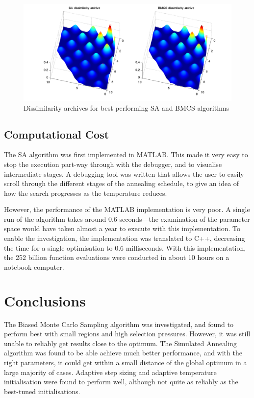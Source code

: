 \documentclass[10pt]{article}
\begin{document}
\begin{figure}[tbp]
  \begin{center}
    \includegraphics[width=15cm]{sa_bmcs_dissim.pdf}
    \end{center}
    \caption{Dissimilarity archives for best performing SA and BMCS algorithms}
    \label{fig:sa_bmcs_dissim}
    \end{figure}

\subsection{Computational Cost}

The SA algorithm was first implemented in MATLAB. This made it very easy to
stop the execution part-way through with the debugger, and to visualise
intermediate stages. A debugging tool was written that allows the user to
easily scroll through the different stages of the annealing schedule, to give
an idea of how the search progresses as the temperature reduces.

However, the performance of the MATLAB implementation is very poor. A single
run of the algorithm takes around 0.6 seconds---the examination of the
parameter space would have taken almost a year to execute with this
implementation. To enable the investigation, the implementation was translated
to C++, decreasing the time for a single optimisation to 0.6 milliseconds.
With this implementation, the 252 billion function evaluations were conducted
in about 10 hours on a notebook computer.

\section{Conclusions}

The Biased Monte Carlo Sampling algorithm was investigated, and found to
perform best with small regions and high selection pressures. However, it was
still unable to reliably get results close to the optimum. The Simulated
Annealing algorithm was found to be able achieve much better performance, and
with the right parameters, it could get within a small distance of the global
optimum in a large majority of cases. Adaptive step sizing \cite{parks} and
adaptive temperature initialisation \cite{kirk} \cite{white:261} were found to
perform well, although not quite as reliably as the best-tuned
initialisations.
\end{document}
